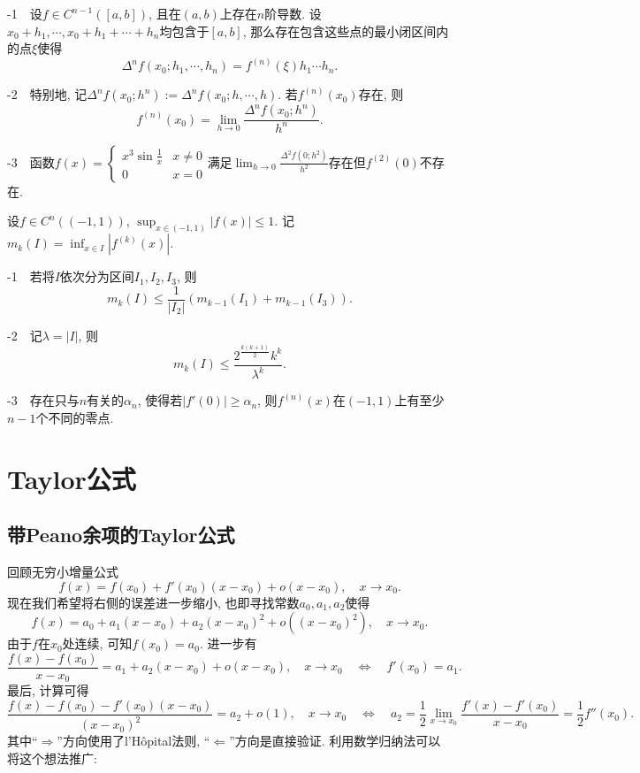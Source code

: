 -1~~设$f \in C^{n-1}([a,b])$, 且在$(a,b)$上存在$n$阶导数. 设$x_0+h_1,\cdots ,x_0+h_1+\cdots +h_n$均包含于$[a,b]$, 那么存在包含这些点的最小闭区间内的点$\xi$使得$$\Delta ^n f(x_0;h_1,\cdots ,h_n) = f^{(n)}(\xi) h_1\cdots h_n. $$

-2~~特别地, 记$\Delta ^nf(x_0;h^n) := \Delta ^nf(x_0;h,\cdots ,h)$. 若$f^{(n)}(x_0)$存在, 则$$f^{(n)}(x_0) = \lim_{h \to 0} \frac{\Delta ^n f(x_0;h^n)}{h^n}. $$

-3~~函数$f(x)=\begin{cases}
	x^3\sin \frac{1}{x} & x\neq 0 \\ 0 & x = 0
\end{cases}$满足$\displaystyle \lim_{h\to 0} \frac{\Delta ^2 f(0;h^2)}{h^2}$存在但$f^{(2)}(0)$不存在. 
\vspace{1em}

设$f \in C^n((-1,1))$, $\sup_{x\in (-1,1)} |f(x)| \leq 1$. 记$m_k(I) = \inf_{x \in I} |f^{(k)}(x)|$. 
\vspace{1em}

-1~~若将$I$依次分为区间$I_1,I_2,I_3$, 则$$m_k(I) \leq \frac{1}{|I_2|} (m_{k-1}(I_1) + m_{k-1}(I_3)). $$

-2~~记$\lambda = |I|$, 则$$m_k(I) \leq \frac{2^{\frac{k(k+1)}{2}} k^k}{\lambda ^k}. $$

-3~~存在只与$n$有关的$\alpha _n$, 使得若$|f'(0)| \geq \alpha _n$, 则$f^{(n)}(x)$在$(-1,1)$上有至少$n-1$个不同的零点. 








\newpage
\section{Taylor公式}

\subsection{带Peano余项的Taylor公式}

回顾无穷小增量公式$$f(x)=f(x_0)+f'(x_0)(x-x_0)+o(x-x_0),\quad x \to x_0.$$
现在我们希望将右侧的误差进一步缩小, 也即寻找常数$a_0,a_1,a_2$使得$$f(x) = a_0 + a_1(x-x_0) + a_2(x-x_0)^2 +o((x-x_0)^2),\quad x \to x_0. $$
由于$f$在$x_0$处连续, 可知$f(x_0)=a_0$. 进一步有$$\frac{f(x)-f(x_0)}{x-x_0} = a_1 + a_2(x-x_0) + o(x-x_0),\quad x \to x_0\quad \Leftrightarrow \quad f'(x_0)=a_1. $$
最后, 计算可得$$\frac{f(x)-f(x_0)-f'(x_0)(x-x_0)}{(x-x_0)^2} = a_2 + o(1), \quad x \to x_0 \quad \Leftrightarrow \quad a_2 = \frac{1}{2} \lim_{x \to x_0} \frac{f'(x)-f'(x_0)}{x-x_0} = \frac{1}{2}f''(x_0).$$
其中“$\Rightarrow$”方向使用了l’Hôpital法则, “$\Leftarrow$”方向是直接验证. 利用数学归纳法可以将这个想法推广: 

